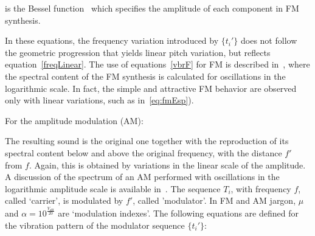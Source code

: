 \noindent is the Bessel function~\cite{BesselCCRMA,JOSFM} which specifies the amplitude of each component in FM synthesis.

In these equations, the frequency variation introduced by $\{t_i'\}$ does not follow the geometric progression that yields linear pitch variation, but reflects equation~\ref{freqLinear}. The use of equations~\ref{vbrF} for FM is described in~\cite{dissertacao}, where the spectral content of the FM synthesis is calculated for oscillations in the logarithmic scale. In fact, the simple and attractive FM behavior are observed only with linear variations, such as in~\ref{eq:fmEsp}).

For the amplitude modulation (AM): 

\newcommand{\OneColEqu}[1]{%
\end{multicols}%
\begin{twocolequfloat}%
\begin{equation}
\{t_i'\}_0^{\Lambda-1} =\{(1+a_i) . t_i\}_0^{\Lambda-1} = \left \{ \left [ 1+M.\sin \left ( f'.2\pi\frac{i}{f_s -1} \right ) \right] .P .\sin \left ( f.2\pi\frac{i}{f_s -1} \right ) \right \}_0^{\Lambda-1} = \\ 
                        =  \left\{P.\sin \left( f.2\pi\frac{i}{f_s -1}  \right ) +  \frac{P.M}{2} \left [ \sin \left( (f-f').2\pi\frac{i}{f_s -1}  \right )  + \sin \left( (f+f').2\pi\frac{i}{f_s -1}  \right ) \right ] \right \}_0^{\Lambda-1}
\end{equation}
\end{twocolequfloat}%
\begin{multicols}{2}%
}



The resulting sound is the original one together with the
reproduction of its spectral content below and above the original frequency, with the distance $f'$ from $f$. Again, this is obtained by variations in the linear scale of the amplitude. A discussion of the
spectrum of an AM performed with oscillations in the logarithmic amplitude scale is available in~\cite{dissertacao}. The sequence $T_i$, with frequency $f$, called `carrier', is modulated by
$f'$, called 'modulator'. In FM and AM jargon, $\mu$ and
$\alpha=10^{\frac{V_{dB}}{20}}$ are `modulation indexes'. The following equations are defined for the vibration pattern of the modulator sequence $\{t_i'\}$:

